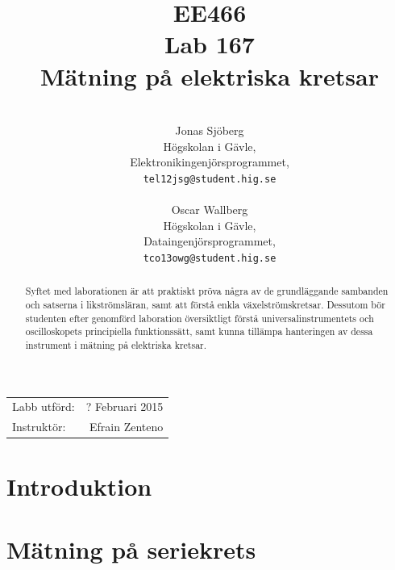 \documentclass[11pt,a4paper]{article}
\title{EE466 \\ Lab 167 \\ Mätning på elektriska kretsar}
\author{\\
  Jonas Sjöberg\\
  Högskolan i Gävle,\\
  Elektronikingenjörsprogrammet,\\
  \texttt{tel12jsg@student.hig.se}\\
  \\
  Oscar Wallberg\\
  Högskolan i Gävle,\\
  Dataingenjörsprogrammet,\\
  \texttt{tco13owg@student.hig.se}\\}
\date{}
\begin{document}
\maketitle

\begin{center}
    \begin{tabular}{l r}
        Labb utförd: & ? Februari 2015 \\
        Instruktör: & Efrain Zenteno
    \end{tabular}
\end{center}

\begin{abstract}
    Syftet med laborationen är att praktiskt pröva några av de grundläggande
    sambanden och satserna i likströmsläran, samt att förstå enkla
    växelströmskretsar. Dessutom bör studenten efter genomförd laboration
    översiktligt förstå universalinstrumentets och oscilloskopets principiella
    funktionssätt, samt kunna tillämpa hanteringen av dessa instrument i
    mätning på elektriska kretsar.
\end{abstract}

\newpage

{
    \setcounter{tocdepth}{3}
    \tableofcontents
}

\newpage

\section{Introduktion}\label{setup}


\section{Mätning på seriekrets}\label{}
\end{document}
